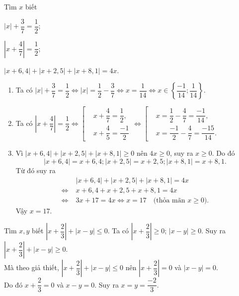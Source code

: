 \begin{vd}
Tìm $x$ biết
\begin{listEX}[2]
	\item $\left|x\right|+\dfrac{3}{7}=\dfrac{1}{2}$;
	\item $\left|x+\dfrac{4}{7}\right|=\dfrac{1}{2}$;
	\item $\left|x+6,4\right|+\left|x+2,5\right|+\left|x+8,1\right|=4x$.
\end{listEX}
\loigiai
{
\begin{enumerate}
\item Ta có $\left|x\right|+\dfrac{3}{7}=\dfrac{1}{2}\Leftrightarrow \left|x\right|=\dfrac{1}{2}-\dfrac{3}{7}\Leftrightarrow x=\dfrac{1}{14}\Leftrightarrow x\in\left\{\dfrac{-1}{14};\dfrac{1}{14}\right\}.$
\item Ta có $\left|x+\dfrac{4}{7}\right|=\dfrac{1}{2}\Leftrightarrow \left[\begin{aligned} &x+\dfrac{4}{7}=\dfrac{1}{2},\\&x+\dfrac{4}{5}=\dfrac{-1}{2} \end{aligned}\right. \Leftrightarrow \left[\begin{aligned} &x=\dfrac{1}{2}-\dfrac{4}{7}=\dfrac{-1}{14},\\&x=\dfrac{-1}{2}-\dfrac{4}{7}=\dfrac{-15}{14}. \end{aligned}\right.$
\item Vì $\left|x+6,\!4\right|+\left|x+2,\!5\right|+\left|x+8,\!1\right|\ge 0$ nên $4x\ge 0$, suy ra $x\ge 0$. Do đó $$\left|x+6,4\right|=x+6,4; \left|x+2,5\right|=x+2,5; \left|x+8,1\right|=x+8,1.$$
Từ đó suy ra \begin{align*}
&\left|x+6,4\right|+\left|x+2,5\right|+\left|x+8,1\right|=4x\\ 
\Leftrightarrow\;&x+6,4+x+2,5+x+8,1=4x\\
\Leftrightarrow\;& 3x+17=4x\Leftrightarrow x=17\quad\text{(thỏa mãn $x\ge 0$)}.
\end{align*}
Vậy $x=17$.
\end{enumerate}
}
\end{vd}
\begin{vd}
Tìm $x,y$ biết $\left|x+\dfrac{2}{3}\right|+\left|x-y\right|\le 0$.
\loigiai
{
Ta có $\left|x+\dfrac{2}{3}\right|\ge 0$; $\left|x-y\right|\ge 0$. Suy ra $\left|x+\dfrac{2}{3}\right|+\left|x-y\right|\ge 0$.\\
Mà theo giả thiết, $\left|x+\dfrac{2}{3}\right|+\left|x-y\right|\le 0$ nên $\left|x+\dfrac{2}{3}\right|=0$ và $\left|x-y\right|=0$.\\
Do đó $x+\dfrac{2}{3}=0$ và $x-y=0$. Suy ra $x=y=\dfrac{-2}{3}$.
}
\end{vd}
